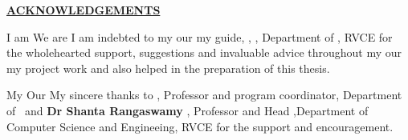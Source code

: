 \thispagestyle{empty}
\ifIDP \vspace{-1cm}\fi
\begin{center}
	\Large\textbf{\underline{ACKNOWLEDGEMENTS}} \par
\end{center}

\ifPG I am \else
\ifStuNameBUsed We are \else I am \fi\fi indebted to \ifPG my \else\ifStuNameBUsed our \else my \fi\fi guide, \textbf{\printGuideNameA}, \printGuideDesigA, Department of \printGuideDeptAInSF, RVCE for the wholehearted support, suggestions and invaluable advice throughout \ifPG my \else\ifStuNameBUsed our \else my \fi\fi project work and also helped in the preparation of this thesis.\\ \par





\ifPG My \else \ifStuNameBUsed Our \else My \fi\fi sincere thanks to \textbf{\printHOD}, Professor and program coordinator, Department of \ifIDP \printGuideDeptAInLF\else\printDepartmentLF \ \fi  and  \textbf{ Dr Shanta Rangaswamy} , Professor and Head ,Department of Computer Science and Engineeing, RVCE for the support and encouragement.\\ \par

